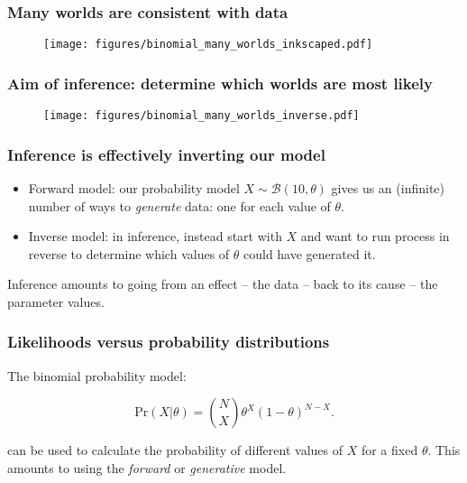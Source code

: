 \documentclass{beamer}
\begin{document}
\begin{frame}
	\frametitle{Many worlds are consistent with data}
	
	\begin{figure}[h]
		\centerline{\texttt{[image: figures/binomial\_many\_worlds\_inkscaped.pdf]}}
	\end{figure}
	
\end{frame}

\begin{frame}
	\frametitle{Aim of inference: determine which worlds are most likely}
	\begin{figure}[h]
		\centerline{\texttt{[image: figures/binomial\_many\_worlds\_inverse.pdf]}}
	\end{figure}
\end{frame}

\begin{frame}
	\frametitle{Inference is effectively inverting our model}
	
	\begin{itemize}
		\item Forward model: our probability model $X\sim \mathcal{B}(10,\theta)$ gives us an (infinite) number of ways to \textit{generate} data: one for each value of $\theta$.
		\item Inverse model: in inference, instead start with $X$ and want to run process in reverse to determine which values of $\theta$ could have generated it.
	\end{itemize}
	
	Inference amounts to going from an effect -- the data -- back to its cause -- the parameter values.
	
\end{frame}

\begin{frame}
	\frametitle{Likelihoods versus probability distributions}
	
	The binomial probability model:
	
	\begin{equation}
	\text{Pr}(X|\theta) = \binom{N}{X} \theta^X (1- \theta)^{N-X}.
	\end{equation}
	
	can be used to calculate the probability of different values of $X$ for a fixed $\theta$. This amounts to using the \textit{forward} or \textit{generative} model.
	
\end{frame}
\end{document}
